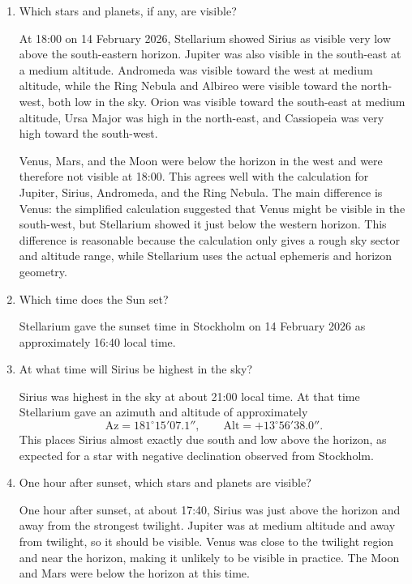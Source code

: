 \documentclass[a4paper,11pt]{article}
\begin{document}
\begin{enumerate}[label=\textbf{\arabic*.}, leftmargin=*]
    \item Which stars and planets, if any, are visible?

    At 18:00 on 14 February 2026, Stellarium showed Sirius as visible very low above the south-eastern horizon. Jupiter was also visible in the south-east at a medium altitude. Andromeda was visible toward the west at medium altitude, while the Ring Nebula and Albireo were visible toward the north-west, both low in the sky. Orion was visible toward the south-east at medium altitude, Ursa Major was high in the north-east, and Cassiopeia was very high toward the south-west.

    Venus, Mars, and the Moon were below the horizon in the west and were therefore not visible at 18:00. This agrees well with the calculation for Jupiter, Sirius, Andromeda, and the Ring Nebula. The main difference is Venus: the simplified calculation suggested that Venus might be visible in the south-west, but Stellarium showed it just below the western horizon. This difference is reasonable because the calculation only gives a rough sky sector and altitude range, while Stellarium uses the actual ephemeris and horizon geometry.

    \item Which time does the Sun set?

    Stellarium gave the sunset time in Stockholm on 14 February 2026 as approximately 16:40 local time.

    \item At what time will Sirius be highest in the sky?

    Sirius was highest in the sky at about 21:00 local time. At that time Stellarium gave an azimuth and altitude of approximately
    \[
        \mathrm{Az} = 181^\circ 15'07.1'', \qquad
        \mathrm{Alt} = +13^\circ 56'38.0''.
    \]
    This places Sirius almost exactly due south and low above the horizon, as expected for a star with negative declination observed from Stockholm.

    \item One hour after sunset, which stars and planets are visible?

    One hour after sunset, at about 17:40, Sirius was just above the horizon and away from the strongest twilight. Jupiter was at medium altitude and away from twilight, so it should be visible. Venus was close to the twilight region and near the horizon, making it unlikely to be visible in practice. The Moon and Mars were below the horizon at this time.


\end{enumerate}
\end{document}

